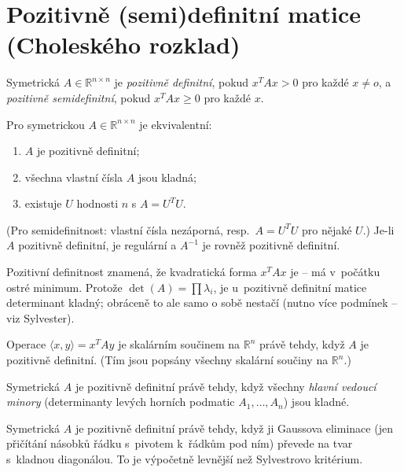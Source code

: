 \documentclass[11pt,a4paper]{article}
\begin{document}
\section{Pozitivně (semi)definitní matice (Choleského rozklad)}

\begin{definice}
Symetrická $A\in\mathbb{R}^{n\times n}$ je \emph{pozitivně definitní}, pokud $x^TAx>0$ pro každé $x\neq o$, a \emph{pozitivně semidefinitní}, pokud $x^TAx\ge0$ pro každé $x$.
\end{definice}

\begin{veta}
Pro symetrickou $A\in\mathbb{R}^{n\times n}$ je ekvivalentní:
\begin{enumerate}[label=(\arabic*)]
  \item $A$ je pozitivně definitní;
  \item všechna vlastní čísla $A$ jsou kladná;
  \item existuje $U$ hodnosti $n$ s $A=U^TU$.
\end{enumerate}
(Pro semidefinitnost: vlastní čísla nezáporná, resp.\ $A=U^TU$ pro nějaké $U$.) Je-li $A$ pozitivně definitní, je regulární a $A^{-1}$ je rovněž pozitivně definitní.
\end{veta}

\begin{intuice}
Pozitivní definitnost znamená, že kvadratická forma $x^TAx$ je  -- má v~počátku ostré minimum. Protože $\det(A)=\prod\lambda_i$, je u~pozitivně definitní matice determinant kladný; obráceně to ale samo o sobě nestačí (nutno více podmínek -- viz Sylvester).
\end{intuice}

\begin{veta}
Operace $\langle x,y\rangle=x^TAy$ je skalárním součinem na $\mathbb{R}^n$ právě tehdy, když $A$ je pozitivně definitní. (Tím jsou popsány všechny skalární součiny na $\mathbb{R}^n$.)
\end{veta}

\begin{veta}
Symetrická $A$ je pozitivně definitní právě tehdy, když všechny \emph{hlavní vedoucí minory} (determinanty levých horních podmatic $A_1,\dots,A_n$) jsou kladné.
\end{veta}

\begin{poznamka}
Symetrická $A$ je pozitivně definitní právě tehdy, když ji Gaussova eliminace (jen přičítání násobků řádku s~pivotem k~řádkům pod ním) převede na tvar s~kladnou diagonálou. To je výpočetně levnější než Sylvestrovo kritérium.
\end{poznamka}
\end{document}
